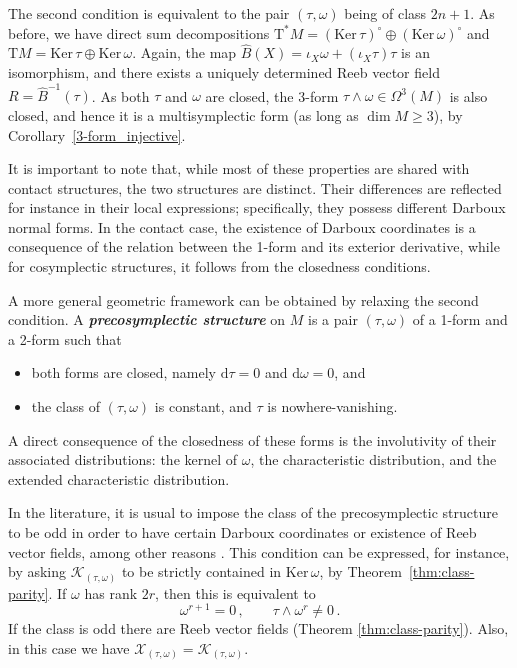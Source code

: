 \documentclass[11pt,twoside]{article}
\theoremstyle{plain}
\theoremstyle{definition}
\renewcommand{\d}{\mathrm{d}}
\newcommand{\T}{{\mathrm T}}
\let\Tan\T
\newcommand*{\inn}[1]{\iota_{#1}}
\def\d{\mathrm{d}}
\newcommand\dfn[1]{{\textbf{\emph{#1}}}}
\def\d{\mathrm{d}}
\def\Ker{\mathrm{Ker \,}}
\def\Tan{\mathrm{T}}
\def\K{\mathcal{K}}
\begin{document}
The second condition is equivalent to the pair $(\tau, \omega)$ being of class $2n+1$.
As before, we have direct sum decompositions 
$
\Tan^* M = (\Ker \tau)^{\circ} \oplus (\Ker \omega)^\circ
$
and
$\Tan M = \Ker \tau \oplus \Ker \omega$.
Again, the map $\widehat B(X) = \inn{X} \omega +(\inn{X}\tau) \tau $ is an isomorphism, and there exists a uniquely determined Reeb vector field $R = \widehat B^{-1}(\tau)$. 
As both $\tau$ and $\omega $ are closed, the 3-form $\tau \wedge \omega \in \Omega^3(M)$ is also closed, and hence it is a multisymplectic form (as long as $\dim M \geq 3$), by Corollary~\ref{3-form_injective}.


It is important to note that, while most of 
these properties are shared with contact structures, the two structures are distinct. Their differences are reflected for instance in their local expressions; specifically, they possess different Darboux normal forms. In the contact case, the existence of Darboux coordinates is a consequence of the relation between the 1-form and its exterior derivative, while for cosymplectic structures, it follows from the closedness conditions.


A more general geometric framework can be obtained by relaxing the second condition.
A \dfn{precosymplectic structure} on $M$ is a pair $(\tau,\omega)$ of a 1-form and a 2-form such that
\begin{itemize}
    \item 
    both forms are closed, namely $\d \tau = 0$ and $\d \omega = 0$, and
    \item 
    the class of $(\tau,\omega)$ is constant, and $\tau$ is nowhere-vanishing.
\end{itemize}

A direct consequence of the closedness of these forms is the involutivity of their associated distributions: the kernel of $\omega$, the characteristic distribution, and the extended characteristic distribution. 

In the literature, it is usual to impose the class of the precosymplectic structure to be odd 
in order to have certain Darboux coordinates or 
existence of Reeb vector fields, among other reasons 
\cite{CLM_1994, GLRR_2024}.
This condition can be expressed, for instance, by asking 
$\K_{(\tau,\omega)}$ to be strictly contained in $\Ker \omega$, by Theorem~\ref{thm:class-parity}. 
If $\omega$ has rank $2r$, then this is equivalent to
$$\omega^{r+1}=0 \,, \qquad \tau \wedge \omega^r \neq 0\,.$$
If the class is odd there are Reeb vector fields
(Theorem \ref{thm:class-parity}).
Also, in this case we have $\mathcal{X}_{(\tau,\omega)} = \K_{(\tau,\omega)}$.
\end{document}
